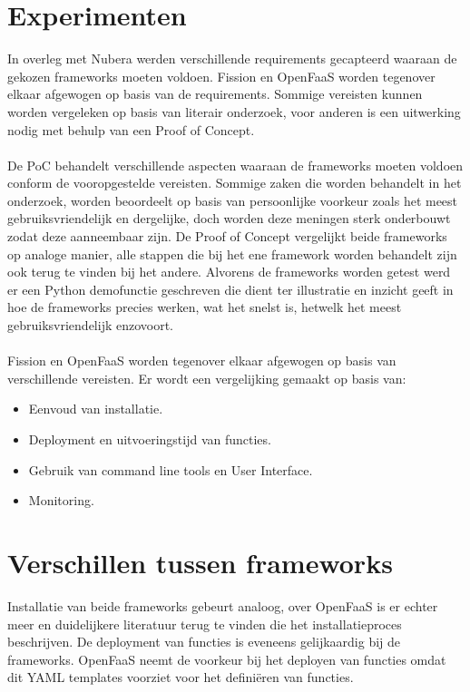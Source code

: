 \documentclass[a0,portrait]{a0poster}
\begin{document}
\begin{multicols}{2}
\section*{Experimenten}
\color{black}
In overleg met Nubera werden verschillende requirements gecapteerd waaraan de gekozen frameworks moeten voldoen. Fission en OpenFaaS worden tegenover elkaar afgewogen op basis van de requirements. Sommige vereisten kunnen worden vergeleken op basis van literair onderzoek, voor anderen is een uitwerking nodig met behulp van een Proof of Concept. 
\\\\
De PoC behandelt verschillende aspecten waaraan de frameworks moeten voldoen conform de vooropgestelde vereisten. Sommige zaken die worden behandelt in het onderzoek, worden beoordeelt op basis van persoonlijke voorkeur zoals het meest gebruiksvriendelijk en dergelijke, doch worden deze meningen sterk onderbouwt zodat deze aanneembaar zijn. De Proof of Concept vergelijkt beide frameworks op analoge manier, alle stappen die bij het ene framework worden behandelt zijn ook terug te vinden bij het andere. Alvorens de frameworks worden getest werd er een Python demofunctie geschreven die dient ter illustratie en inzicht geeft in hoe de frameworks precies werken, wat het snelst is, hetwelk het meest gebruiksvriendelijk enzovoort.
\\\\
Fission en OpenFaaS worden tegenover elkaar afgewogen op basis van verschillende vereisten. Er wordt een vergelijking gemaakt op basis van:
\begin{itemize}
    \item Eenvoud van installatie.
    \item Deployment en uitvoeringstijd van functies.
    \item Gebruik van command line tools en User Interface.
    \item Monitoring.
\end{itemize} 
\color{HoGentAccent1} 
\section*{Verschillen tussen frameworks}
\color{black}
Installatie van beide frameworks gebeurt analoog, over OpenFaaS is er echter meer en duidelijkere literatuur terug te vinden die het installatieproces beschrijven. De deployment van functies is eveneens gelijkaardig bij de frameworks. OpenFaaS neemt de voorkeur bij het deployen van functies omdat dit YAML templates voorziet voor het definiëren van functies.
\\


\end{multicols}
\end{document}
